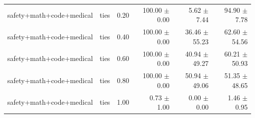 \begin{table}[H]
{\begin{tabular}{lllrrr}
safety+math+code+medical & ties & 0.20 & 100.00 $\pm$ 0.00 & 5.62 $\pm$ 7.44 & 94.90 $\pm$ 7.78 \\
safety+math+code+medical & ties & 0.40 & 100.00 $\pm$ 0.00 & 36.46 $\pm$ 55.23 & 62.60 $\pm$ 54.56 \\
safety+math+code+medical & ties & 0.60 & 100.00 $\pm$ 0.00 & 40.94 $\pm$ 49.27 & 60.21 $\pm$ 50.93 \\
safety+math+code+medical & ties & 0.80 & 100.00 $\pm$ 0.00 & 50.94 $\pm$ 49.06 & 51.35 $\pm$ 48.65 \\
safety+math+code+medical & ties & 1.00 & 0.73 $\pm$ 1.00 & 0.00 $\pm$ 0.00 & 1.46 $\pm$ 0.95 \\
\bottomrule
\end{tabular}
}
\end{table}


